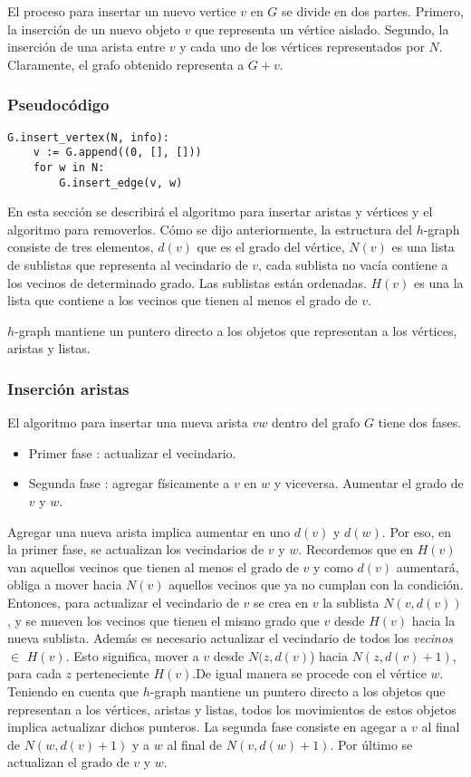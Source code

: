 \documentclass[a4paper,12pt]{article}
\begin{document}
El proceso para insertar un nuevo vertice $v$ en $G$ se divide en dos partes.  Primero, la inserción de un nuevo objeto $v$ que representa un vértice aislado.  Segundo, la inserción de una arista entre $v$ y cada uno de los vértices representados por $N$.  Claramente, el grafo obtenido representa a $G + v$.

\subsubsection*{Pseudocódigo}

\begin{lstlisting}
G.insert_vertex(N, info):
    v := G.append((0, [], []))
    for w in N:
        G.insert_edge(v, w)
\end{lstlisting}


En esta sección se describirá el algoritmo para insertar aristas y vértices y el algoritmo para removerlos.
Cómo se dijo anteriormente, la estructura del $h$-graph consiste de tres elementos, $d(v)$ que es el grado del vértice, $N(v)$ es una lista de sublistas que representa al vecindario de $v$, cada sublista no vacía contiene a los vecinos de determinado grado. Las sublistas están ordenadas. $H(v)$ es una la lista que contiene a los vecinos que tienen al menos el grado de $v$.

$h$-graph mantiene un puntero directo a los objetos que representan a los vértices, aristas y listas.



\subsubsection{Inserción aristas}

El algoritmo para insertar una nueva arista $vw$ dentro del grafo $G$ tiene dos fases.
\begin{itemize}
\item Primer fase : actualizar el vecindario.
\item Segunda fase : agregar físicamente a $v$ en $w$ y viceversa. Aumentar el grado de $v$ y $w$.
\end{itemize}

Agregar una nueva arista implica aumentar en uno $d(v)$ y $d(w)$. Por eso, en la primer fase, se actualizan los vecindarios de $v$ y $w$. Recordemos que en $H(v)$ van aquellos vecinos que tienen al menos el grado de $v$ y como $d(v)$ aumentará, obliga a mover hacia $N(v)$ aquellos vecinos que ya no cumplan con la condición. Entonces, para actualizar el vecindario de $v$ se crea en $v$ la sublista $N(v, d(v))$, y se mueven los vecinos que tienen el mismo grado que $v$ desde $H(v)$ hacia la nueva sublista.
Además es necesario actualizar el vecindario de todos los \emph{vecinos} $\in$ $H(v)$. Esto significa, mover a $v$ desde $N(z,d(v)$) hacia $N(z, d(v)+1)$, para cada $z$  perteneciente $H(v)$.De igual manera se procede con el vértice $w$.
Teniendo en cuenta que $h$-graph mantiene un puntero directo a los objetos que representan a los vértices, aristas y listas, todos los movimientos de estos objetos implica actualizar dichos punteros.
La segunda fase consiste en agegar a $v$ al final de $N(w,d(v)+1)$ y a $w$ al final de $N(v,d(w)+1)$. Por último se actualizan el grado de $v$ y $w$.
\end{document}
